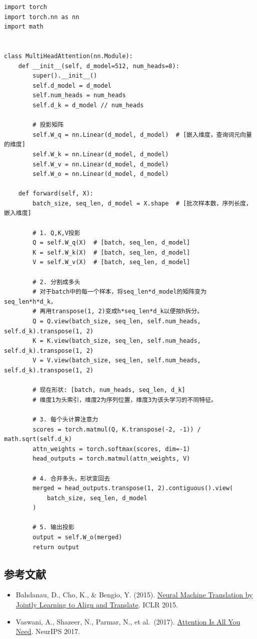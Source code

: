 \begin{verbatim}
import torch
import torch.nn as nn
import math


class MultiHeadAttention(nn.Module):
    def __init__(self, d_model=512, num_heads=8):
        super().__init__()
        self.d_model = d_model
        self.num_heads = num_heads
        self.d_k = d_model // num_heads

        # 投影矩阵
        self.W_q = nn.Linear(d_model, d_model)  # [嵌入维度，查询词元向量的维度]
        self.W_k = nn.Linear(d_model, d_model)
        self.W_v = nn.Linear(d_model, d_model)
        self.W_o = nn.Linear(d_model, d_model)

    def forward(self, X):
        batch_size, seq_len, d_model = X.shape  # [批次样本数，序列长度，嵌入维度]

        # 1. Q,K,V投影
        Q = self.W_q(X)  # [batch, seq_len, d_model]
        K = self.W_k(X)  # [batch, seq_len, d_model]
        V = self.W_v(X)  # [batch, seq_len, d_model]

        # 2. 分割成多头
        # 对于batch中的每一个样本，将seq_len*d_model的矩阵变为seq_len*h*d_k，
        # 再用transpose(1, 2)变成h*seq_len*d_k以便按h拆分。
        Q = Q.view(batch_size, seq_len, self.num_heads, self.d_k).transpose(1, 2)
        K = K.view(batch_size, seq_len, self.num_heads, self.d_k).transpose(1, 2)
        V = V.view(batch_size, seq_len, self.num_heads, self.d_k).transpose(1, 2)

        # 现在形状: [batch, num_heads, seq_len, d_k]
        # 维度1为头索引，维度2为序列位置，维度3为该头学习的不同特征。

        # 3. 每个头计算注意力
        scores = torch.matmul(Q, K.transpose(-2, -1)) / math.sqrt(self.d_k)
        attn_weights = torch.softmax(scores, dim=-1)
        head_outputs = torch.matmul(attn_weights, V)

        # 4. 合并多头，形状变回去
        merged = head_outputs.transpose(1, 2).contiguous().view(
            batch_size, seq_len, d_model
        )

        # 5. 输出投影
        output = self.W_o(merged)
        return output
\end{verbatim}

\hypertarget{ux53c2ux8003ux6587ux732e-67}{%
\subsection{参考文献}\label{ux53c2ux8003ux6587ux732e-67}}

\vspace{0.25em}
\begin{itemize}
\tightlist
\item
  Bahdanau, D., Cho, K., \& Bengio, Y. (2015). \href{https://arxiv.org/abs/1409.0473}{Neural Machine Translation by Jointly Learning to Align and Translate}. ICLR 2015.
\item
  Vaswani, A., Shazeer, N., Parmar, N., et al.~(2017). \href{https://arxiv.org/abs/1706.03762}{Attention Is All You Need}. NeurIPS 2017.
\end{itemize}

